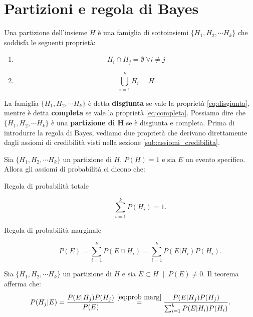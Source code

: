 \documentclass[../main.tex]{subfiles}
\begin{document}
\section{Partizioni e regola di Bayes}
\begin{definition}
    Una partizione dell'insieme $H$ è una famiglia di sottoinsiemi $\{ H_{1},H_{2},\cdots H_{k}\}$ che soddisfa le seguenti proprietà:
    \begin{enumerate}
        \item \begin{equation}
            \label{eq:disgiunta}
             H_{i}\cap H_{j}=\emptyset \; \forall  i\neq j
        \end{equation}
        \item \begin{equation}
            \label{eq:completa}
            \bigcup_{i=1}^{k}H_{i}=H
        \end{equation}
    \end{enumerate}
\end{definition}
\hfill \break
La famiglia $\{ H_{1},H_{2},\cdots H_{k}\}$ è detta \textbf{disgiunta} se vale la proprietà \ref{eq:disgiunta}, mentre è detta \textbf{completa} se vale la proprietà \ref{eq:completa}.
Possiamo dire che $\{ H_{1},H_{2},\cdots H_{k}\}$ è una \textbf{partizione di H} se è disgiunta e completa.
\hfill \break
Prima di introdurre la regola di Bayes, vediamo due proprietà che derivano direttamente dagli assiomi di credibilità visti nella sezione \ref*{sub:assiomi_credibilita}.
\break
\begin{lemma}
    \label{lem:prob marg}
    Sia $\{ H_{1},H_{2},\cdots H_{k}\}$ un partizione di $H$, $P(H)=1$ e sia $E$ un evento specifico. Allora gli assiomi di probabilità ci dicono che:
    \begin{description}
        \item[Regola di probabilità totale]\begin{equation}\label{eq:prob tot}
            \sum_{i=1}^{k}P(H_{i})=1.
        \end{equation}
        \item[Regola di probabilità marginale]\begin{equation}\label{eq:prob marg}
            P(E)=\sum_{i=1}^{k}P(E\cap H_{i})=\sum_{i=1}^{k}P(E|H_{i})P(H_{i}).
        \end{equation}
    \end{description}
\end{lemma}
\begin{theorem}\label{th:teorema_bayes}
    Sia $\{ H_{1},H_{2},\cdots H_{k}\}$ un partizione di $H$ e sia $E \subset H \; \mid \; P(E)\ne 0$. Il teorema afferma che:
\begin{equation}\label{eq:regola_bayes}
    P(H_{j}|E)=\frac{P(E|H_{j})P(H_{j})}{P(E)}\stackrel{\ref{eq:prob marg}}{=}\frac{P(E|H_{j})P(H_{j})}{\sum_{i=1}^{k}P(E|H_{i})P(H_{i})}.
\end{equation}
\end{theorem}
\end{document}

